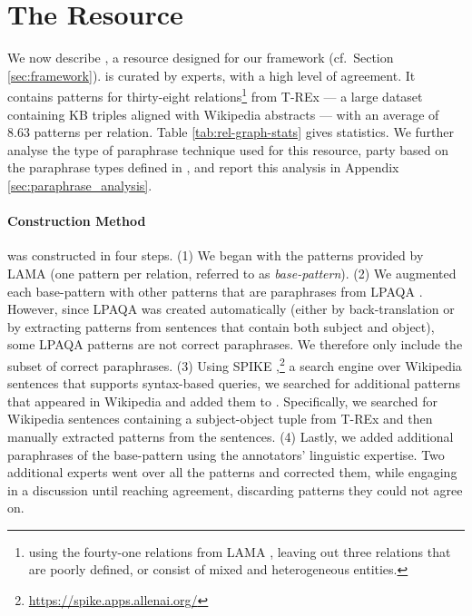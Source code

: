 \section{The \resource{} Resource}
\label{sec:rel-graph}

We now describe \resource{}, a resource designed for our framework (cf.\ Section \ref{sec:framework}).
\resource{} is curated by experts, with a high level of agreement.
It contains patterns for thirty-eight relations\footnote{using the fourty-one relations from LAMA \cite{lama}, leaving out three relations that are poorly defined, or consist of mixed and heterogeneous entities.} from T-REx \cite{trex} --- a large dataset containing KB triples aligned with Wikipedia abstracts --- with an average of 8.63 patterns per relation.
Table \ref{tab:rel-graph-stats} gives statistics.
We further analyse the type of paraphrase technique used for this resource, party based on the paraphrase types defined in \citet{what_is_paraphrase}, and report this analysis in Appendix \ref{sec:paraphrase_analysis}.


\paragraph{Construction Method}
\resource{} was constructed in four steps. (1) We began with
the patterns provided by LAMA \cite{lama} (one pattern per
relation, referred to as \textit{base-pattern}). (2) We augmented each base-pattern with other patterns that are paraphrases from
LPAQA \cite{alpaqa}. However, since LPAQA was
created automatically (either by back-translation or by extracting patterns from sentences that contain both subject and object), some LPAQA patterns are not
correct paraphrases.
We therefore only include the subset of correct paraphrases.
(3) Using SPIKE
\cite{spike},\footnote{\url{https://spike.apps.allenai.org/}}
a search engine over Wikipedia sentences that supports
syntax-based queries, we searched for additional patterns
that appeared in Wikipedia and added them to 
\resource{}. Specifically, we searched for Wikipedia sentences
containing a  subject-object
tuple from T-REx and then manually extracted 
patterns from the sentences. (4) Lastly, we added
additional paraphrases of the base-pattern
using the annotators' linguistic expertise. Two additional
experts went over all the patterns and corrected them, while
engaging in a discussion until reaching agreement,
discarding patterns they could not agree on.

